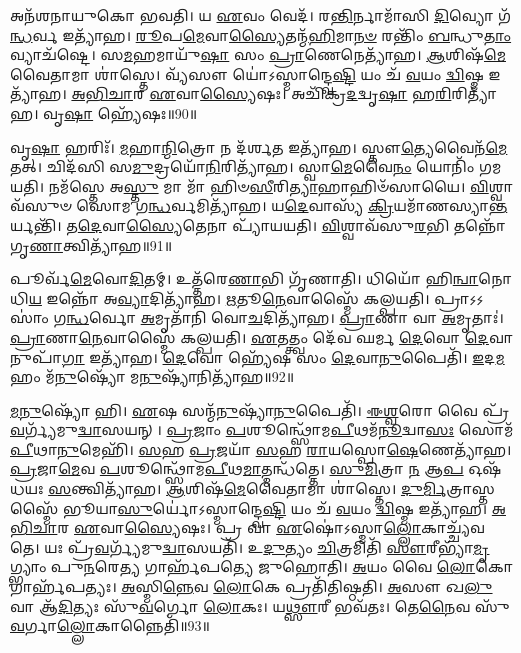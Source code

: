 𑌅𑌨᳴𑌶𑌨𑌾𑌯𑍁𑌕𑍋 𑌭𑌵𑌤𑌿। 
𑌯 \ul{𑌏}\-𑌵𑌂 𑌵𑍇𑌦᳴। 
𑌰\-\ul{𑌨𑍍𑌤𑌿}\-𑌰𑍍𑌨𑌾𑌮𑌾᳴𑌸𑌿 \ul{𑌦𑌿}\-𑌵𑍍𑌯𑍋 𑌗᳴\-\ul{𑌨𑍍𑌧}\-𑌰𑍍𑌵 𑌇𑌤𑍍𑌯𑌾᳴𑌹। 
\-\ul{𑌰𑍂}\-𑌪\-\ul{𑌮𑍇}\-𑌵𑌾\-\ul{𑌸𑍍𑌯𑍈}\-𑌤𑌨𑍍𑌮᳴\-\ul{𑌹𑌿}\-𑌮𑌾\-\ul{𑌨}\-\-\ul{𑍞} 𑌰𑌨𑍍𑌤𑌿𑌂᳴ \ul{𑌬}\-𑌨𑍍𑌧𑍁\-\ul{𑌤𑌾𑌂} 𑌵𑍍𑌯𑌾𑌚᳴𑌷𑍍𑌟𑍇। 
𑌸\-\ul{𑌮}\-𑌹𑌮𑌾𑌯𑍁᳴\-\ul{𑌷𑌾} 𑌸𑌂 \ul{𑌪𑍍𑌰𑌾}\-𑌣𑍇𑌨𑍇𑌤𑍍𑌯𑌾᳴𑌹। 
\-\ul{𑌆}\-𑌶𑌿𑌷᳴\-\ul{𑌮𑍇}\-𑌵𑍈𑌤𑌾𑌮𑌾 𑌶𑌾॑𑌸𑍍𑌤𑍇। 
𑌵𑍍𑌯᳴𑌸𑍗 𑌯𑍋॑𑌽𑌸𑍍𑌮𑌾𑌨𑍍𑌦𑍍𑌵𑍇\-\ul{𑌷𑍍𑌟𑌿} 𑌯𑌂 𑌚᳴ \ul{𑌵}\-𑌯𑌂 \ul{𑌦𑍍𑌵𑌿}\-𑌷𑍍𑌮 𑌇𑌤𑍍𑌯𑌾᳴𑌹। 
\-\ul{𑌅}\-\-\ul{𑌭𑌿}\-\-\ul{𑌚𑌾}\-𑌰 \ul{𑌏}\-𑌵𑌾\-\ul{𑌸𑍍𑌯𑍈}\-𑌷𑌃। 
𑌅𑌚𑌿᳴𑌕𑍍𑌰\-\ul{𑌦}\-𑌦𑍍𑌵𑍃\-\ul{𑌷𑌾} 𑌹\-\ul{𑌰𑌿}\-𑌰𑌿𑌤𑍍𑌯𑌾᳴𑌹। 
𑌵𑍃\-\ul{𑌷𑌾} 𑌹𑍍𑌯𑍇᳴𑌷𑌃॥90॥

𑌵𑍃\-\ul{𑌷𑌾} 𑌹𑌰𑌿𑌃᳴। 
\-\ul{𑌮}\-𑌹𑌾\-\ul{𑌨𑍍𑌮𑌿}\-𑌤𑍍𑌰𑍋 𑌨 𑌦᳴𑌰𑍍\mbox{}\-\ul{𑌶}\-𑌤 𑌇𑌤𑍍𑌯𑌾᳴𑌹। 
𑌸𑍍𑌤𑍗\-\ul{𑌤𑍍𑌯𑍇}\-𑌵𑍈𑌨᳴\-\ul{𑌮𑍇}\-𑌤𑌤𑍍। 
𑌚𑌿𑌦᳴𑌸𑌿 𑌸\-\ul{𑌮𑍁}\-𑌦𑍍𑌰𑌯𑍋᳴\-\ul{𑌨𑌿}\-𑌰𑌿𑌤𑍍𑌯𑌾᳴𑌹। 
𑌸𑍍𑌵𑌾\-\ul{𑌮𑍇}\-𑌵𑍈\-\ul{𑌨𑌂} 𑌯𑍋𑌨𑌿𑌂᳴ 𑌗𑌮𑌯𑌤𑌿। 
𑌨𑌮᳴𑌸𑍍𑌤𑍇 𑌅\-\ul{𑌸𑍍𑌤𑍁} 𑌮𑌾 𑌮𑌾᳴ 𑌹𑌿𑍞\-\ul{𑌸𑍀}\-𑌰𑌿\-\ul{𑌤𑍍𑌯𑌾}\-𑌹𑌾𑌹𑌿𑍞᳴𑌸𑌾𑌯𑍈। 
\-\ul{𑌵𑌿}\-𑌶𑍍𑌵𑌾𑌵᳴𑌸𑍁𑍞 𑌸𑍋𑌮 𑌗\-\ul{𑌨𑍍𑌧}\-𑌰𑍍𑌵𑌮𑌿𑌤𑍍𑌯𑌾᳴𑌹। 
𑌯\-\ul{𑌦𑍇}\-𑌵𑌾𑌸𑍍𑌯᳴ \ul{𑌕𑍍𑌰𑌿}\-𑌯𑌮𑌾᳴𑌣\-𑌸𑍍𑌯𑌾\-\ul{𑌨𑍍𑌤}\-𑌰𑍍𑌯𑌨𑍍𑌤𑌿᳴। 
𑌤\-\ul{𑌦𑍇}\-𑌵𑌾\-\ul{𑌸𑍍𑌯𑍈}\-𑌤𑍇𑌨𑌾 𑌪𑍍𑌯𑌾᳴𑌯𑌯𑌤𑌿। 
\-\ul{𑌵𑌿}\-𑌶𑍍𑌵𑌾𑌵᳴𑌸𑍁\-\ul{𑌰}\-𑌭𑌿 𑌤𑌨𑍍𑌨𑍋᳴ 𑌗𑍃\-\ul{𑌣𑌾}\-𑌤𑍍𑌵𑌿\-𑌤𑍍𑌯𑌾᳴𑌹॥91॥

𑌪𑍂𑌰𑍍𑌵᳴\-\ul{𑌮𑍇}\-𑌵𑍋\-\ul{𑌦𑌿}\-𑌤𑌮𑍍। 
𑌉𑌤𑍍𑌤᳴𑌰𑍇\-\ul{𑌣𑌾}\-𑌭𑌿 𑌗𑍃᳴𑌣𑌾𑌤𑌿। 
𑌧𑌿𑌯𑍋᳴ 𑌹𑌿\-\ul{𑌨𑍍𑌵𑌾}\-𑌨𑍋 𑌧𑌿\-\ul{𑌯} 𑌇𑌨𑍍𑌨𑍋᳴ 𑌅\-\ul{𑌵𑍍𑌯𑌾}\-𑌦𑌿𑌤𑍍𑌯𑌾᳴𑌹। 
\-\ul{𑌋}\-𑌤𑍂\-\ul{𑌨𑍇}\-𑌵𑌾𑌸𑍍𑌮𑍈᳴ 𑌕𑌲𑍍𑌪𑌯𑌤𑌿। 
𑌪𑍍𑌰𑌾𑌽𑌽𑌸𑌾𑌂॑ 𑌗\-\ul{𑌨𑍍𑌧}\-𑌰𑍍𑌵𑍋 \ul{𑌅}\-𑌮𑍃𑌤𑌾᳴𑌨𑌿 𑌵𑍋\-\ul{𑌚}\-𑌦𑌿𑌤𑍍𑌯𑌾᳴𑌹। 
\-\ul{𑌪𑍍𑌰𑌾}\-𑌣𑌾 𑌵𑌾 \ul{𑌅}\-𑌮𑍃𑌤𑌾𑌃॑। 
\-\ul{𑌪𑍍𑌰𑌾}\-𑌣𑌾\-\ul{𑌨𑍇}\-𑌵𑌾𑌸𑍍𑌮𑍈᳴ 𑌕𑌲𑍍𑌪𑌯𑌤𑌿। 
\-\ul{𑌏}\-𑌤𑌤𑍍𑌤𑍍𑌵𑌂 𑌦𑍇᳴𑌵 𑌘𑌰𑍍𑌮 \ul{𑌦𑍇}\-𑌵𑍋 \ul{𑌦𑍇}\-𑌵𑌾𑌨𑍁𑌪𑌾᳴\-\ul{𑌗𑌾} 𑌇𑌤𑍍𑌯𑌾᳴𑌹। 
\-\ul{𑌦𑍇}\-𑌵𑍋 𑌹𑍍𑌯𑍇᳴𑌷 𑌸𑌂 \ul{𑌦𑍇}\-𑌵𑌾\-\ul{𑌨𑍁}\-𑌪𑍈𑌤𑌿᳴। 
\-\ul{𑌇}\-𑌦\-\ul{𑌮}\-𑌹𑌂 𑌮᳴\-\ul{𑌨𑍁}\-𑌷𑍍𑌯𑍋᳴ 𑌮\-\ul{𑌨𑍁}\-𑌷𑍍𑌯𑌾᳴𑌨𑌿𑌤𑍍𑌯𑌾᳴𑌹॥92॥

\-\ul{𑌮}\-\-\ul{𑌨𑍁}\-𑌷𑍍𑌯𑍋᳴ 𑌹𑌿। 
\-\ul{𑌏}\-𑌷 𑌸𑌨𑍍𑌮᳴\-\ul{𑌨𑍁}\-𑌷𑍍𑌯𑌾᳴\-\ul{𑌨𑍁}\-𑌪𑍈𑌤𑌿᳴। 
\-\ul{𑌈}\-\-\ul{𑌶𑍍𑌵}\-𑌰𑍋 𑌵𑍈 𑌪𑍍𑌰᳴\-\ul{𑌵}\-𑌰𑍍𑌗𑍍𑌯᳴𑌮𑍁\-\ul{𑌦𑍍𑌵𑌾}\-𑌸𑌯𑌨𑍍। 
\-\ul{𑌪𑍍𑌰}\-𑌜𑌾𑌂 \ul{𑌪}\-𑌶𑍂𑌨𑍍𑌥𑍍𑌸𑍋᳴𑌮\-\ul{𑌪𑍀}\-𑌥𑌮᳴\-\ul{𑌨𑍂}\-𑌦𑍍𑌵𑌾\-\ul{𑌸𑌃} 𑌸𑍋𑌮᳴ \ul{𑌪𑍀}\-𑌥𑌾\-\ul{𑌨𑍁}\-𑌮𑍇𑌹𑌿᳴। 
\-\ul{𑌸}\-𑌹 \ul{𑌪𑍍𑌰}\-𑌜𑌯𑌾᳴ \ul{𑌸}\-𑌹 \ul{𑌰𑌾}\-𑌯𑌸𑍍𑌪𑍋\-\ul{𑌷𑍇}\-𑌣𑍇𑌤𑍍𑌯𑌾᳴𑌹। 
\-\ul{𑌪𑍍𑌰}\-𑌜𑌾\-\ul{𑌮𑍇}\-𑌵 \ul{𑌪}\-𑌶𑍂𑌨𑍍𑌥𑍍𑌸𑍋᳴𑌮\-\ul{𑌪𑍀}\-𑌥\-\ul{𑌮𑌾}\-𑌤𑍍𑌮𑌨𑍍𑌧᳴𑌤𑍍𑌤𑍇। 
\-\ul{𑌸𑍁}\-\-\ul{𑌮𑌿}\-𑌤𑍍𑌰𑌾 \ul{𑌨} 𑌆\-\ul{𑌪} 𑌓𑌷᳴𑌧𑌯𑌃 \ul{𑌸}\-𑌨𑍍𑌤𑍍𑌵𑌿𑌤𑍍𑌯𑌾᳴𑌹। 
\-\ul{𑌆}\-𑌶𑌿𑌷᳴\-\ul{𑌮𑍇}\-𑌵𑍈𑌤𑌾𑌮𑌾 𑌶𑌾॑𑌸𑍍𑌤𑍇। 
\-\ul{𑌦𑍁}\-\-\ul{𑌰𑍍𑌮𑌿}\-𑌤𑍍𑌰𑌾𑌸𑍍𑌤𑌸𑍍𑌮𑍈᳴ 𑌭𑍂𑌯𑌾\-\ul{𑌸𑍁}\-𑌰𑍍𑌯𑍋॑𑌽𑌸𑍍𑌮𑌾𑌨𑍍𑌦𑍍𑌵𑍇\-\ul{𑌷𑍍𑌟𑌿} 𑌯𑌂 𑌚᳴ \ul{𑌵}\-𑌯𑌂 \ul{𑌦𑍍𑌵𑌿}\-𑌷𑍍𑌮 𑌇𑌤𑍍𑌯𑌾᳴𑌹। 
\-\ul{𑌅}\-\-\ul{𑌭𑌿}\-\-\ul{𑌚𑌾}\-𑌰 \ul{𑌏}\-𑌵𑌾\-\ul{𑌸𑍍𑌯𑍈}\-𑌷𑌃। 
𑌪𑍍𑌰 𑌵𑌾 \ul{𑌏}\-𑌷𑍋॑𑌽𑌸𑍍𑌮𑌾\-\ul{𑌲𑍍𑌲𑍋}\-𑌕𑌾𑌚𑍍𑌚𑍍𑌯᳴𑌵𑌤𑍇। 
𑌯𑌃 𑌪𑍍𑌰᳴\-\ul{𑌵}\-𑌰𑍍𑌗𑍍𑌯᳴𑌮𑍁\-\ul{𑌦𑍍𑌵𑌾}\-𑌸𑌯𑌤𑌿᳴। 
𑌉\-\ul{𑌦𑍁}\-𑌤𑍍𑌯𑌂 \ul{𑌚𑌿}\-𑌤𑍍𑌰𑌮𑌿𑌤𑌿᳴ \ul{𑌸𑍗}\-𑌰𑍀𑌭𑍍𑌯𑌾᳴\-\ul{𑌮𑍃}\-𑌗𑍍𑌭𑍍𑌯𑌾𑌂 𑌪𑍁\-\ul{𑌨}\-𑌰𑍇\-\ul{𑌤𑍍𑌯} 𑌗𑌾𑌰𑍍\mbox{}𑌹᳴𑌪𑌤𑍍𑌯𑍇 𑌜𑍁𑌹𑍋𑌤𑌿। 
\-\ul{𑌅}\-𑌯𑌂 𑌵𑍈 \ul{𑌲𑍋}\-𑌕𑍋 𑌗𑌾𑌰𑍍\mbox{}𑌹᳴𑌪𑌤𑍍𑌯𑌃। 
\-\ul{𑌅}\-𑌸𑍍𑌮𑌿\-\ul{𑌨𑍍𑌨𑍇}\-𑌵 \ul{𑌲𑍋}\-𑌕𑍇 𑌪𑍍𑌰𑌤𑌿᳴𑌤𑌿𑌷𑍍𑌠𑌤𑌿। 
\-\ul{𑌅}\-𑌸𑍗 𑌖\-\ul{𑌲𑍁} 𑌵𑌾 𑌆᳴\-\ul{𑌦𑌿}\-𑌤𑍍𑌯𑌃 𑌸𑍁᳴\-\ul{𑌵}\-𑌰𑍍𑌗𑍋 \ul{𑌲𑍋}\-𑌕𑌃। 
𑌯\-\ul{𑌥𑍍𑌸𑍗}\-𑌰𑍀 𑌭𑌵᳴𑌤𑌃। 
𑌤𑍇\-\ul{𑌨𑍈}\-𑌵 𑌸𑍁᳴\-\ul{𑌵}\-𑌰𑍍𑌗𑌾\-\ul{𑌲𑍍𑌲𑍋}\-𑌕𑌾𑌨𑍍𑌨𑍈𑌤𑌿᳴॥93॥
\anuvakamend[𑌬𑍍𑌰𑌹𑍍𑌮᳴𑌣𑌸𑍍𑌤𑍍𑌵𑌾 𑌪\-\ul{𑌰}\-𑌸𑍍𑌪𑌾\-\ul{𑌯𑌾} 𑌇𑌤𑍍𑌯𑌾᳴𑌹 𑌦𑌧𑌾\-\ul{𑌤𑍍𑌯}\-𑌨𑍍𑌵𑌿𑌤𑍍𑌯᳴ 𑌰\-\ul{𑌕𑍍𑌷}\-𑌸𑍍𑌵𑍀 𑌰𑌕𑍍𑌷᳴\-\ul{𑌸𑌾}\-𑌮𑌪᳴𑌹\-\ul{𑌤𑍍𑌯𑍈} 𑌵𑍈 𑌹𑌿𑌰᳴𑌣𑍍𑌯𑌮𑌾𑌹𑌾𑌰𑍍𑌧𑌯\-\ul{𑌤𑌿} 𑌹𑍍𑌯𑍇᳴𑌷 𑌗𑍃᳴\-\ul{𑌣𑌾}\-𑌤𑍍𑌵𑌿𑌤𑍍𑌯𑌾᳴𑌹 𑌮\-\ul{𑌨𑍁}\-𑌷𑍍𑌯𑌾᳴𑌨𑌿𑌤𑍍𑌯𑌾᳴𑌹𑌾\-\ul{𑌸𑍍𑌯𑍈}\-𑌷𑍋॑𑌽𑌷𑍍𑌟𑍗 𑌚᳴]

